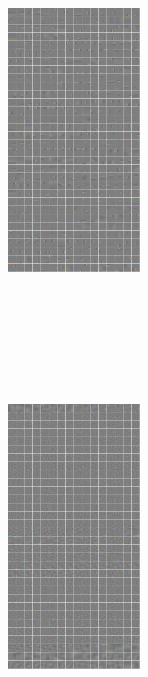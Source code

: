 \documentclass[12pt,a4paper]{report}
\begin{document}
\begin{figure}[ht]
\centering 
\begin{subfigure}
		\centering 
		\includegraphics[width=3.5cm, height=10cm]{./decoder_images/sf_model1.png}
    \end{subfigure} 
	\begin{subfigure}
		\centering 
		\includegraphics[width=3.5cm, height=10cm]{./decoder_images/sf_model2.png}
	\end{subfigure} 
	\begin{subfigure}
		\centering 

\end{subfigure}
\end{figure}
\end{document}

